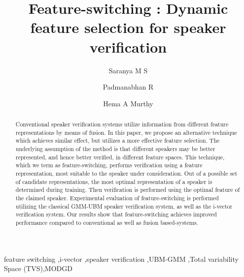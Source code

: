 \documentclass[preprint,12pt,5p]{elsarticle}
\begin{document}
\begin{frontmatter}

\title{ {\bf Feature-switching : Dynamic feature selection for speaker verification}}

\author[label1]{Saranya M S}
\address[label1]{Indian Institue of Technology Madras}


\author[label2]{Padmanabhan R}
\address[label2]{Indian Institute of Technology Mandi}

\author[label1]{Hema A Murthy}

\begin{abstract}

Conventional speaker verification systems utilize information from different
feature representations by means of fusion. In this paper, we propose an
alternative technique which achieves similar effect, but 
utilizes a more effective feature selection. The underlying assumption of the 
method is that different speakers may be better represented, and hence better 
verified, in different feature spaces.  This technique, which we term as feature-switching, 
performs verification using a feature representation, most suitable to the
speaker under consideration. %
Out of a possible set of candidate representations, the most optimal
representation of a speaker is determined during training. Then verification is
performed using the optimal feature of the claimed speaker. Experimental evaluation
of feature-switching is performed utilizing the classical GMM-UBM speaker
verification system, as well as the i-vector verification system. Our results show
that feature-switching achieves improved performance compared to conventional as well
as fusion based-systems.

\end{abstract}

\begin{keyword}
feature switching \sep i-vector \sep speaker verification \sep UBM-GMM \sep Total variability Space (TVS)\sep MODGD
\end{keyword}

\end{frontmatter}

\flushend 
\end{document}
